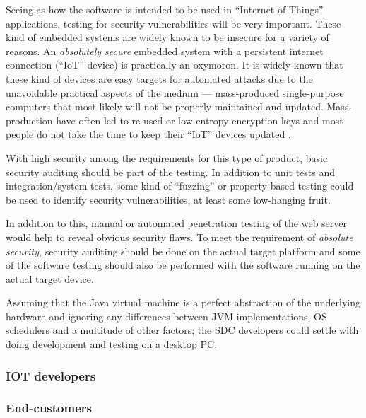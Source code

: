 Seeing as how the software is intended to be used in ``Internet of Things''
applications, testing for security vulnerabilities will be very important.
These kind of embedded systems are widely known to be insecure for a variety of
reasons. \cite{iot-malwarebytes}
An \emph{absolutely secure} embedded system with a persistent internet
connection (``IoT'' device) is practically an oxymoron. It is widely known that
these kind of devices are easy targets for automated attacks due to the
unavoidable practical aspects of the medium --- mass-produced single-purpose
computers that most likely will not be properly maintained and updated.
Mass-production have often led to re-used or low entropy encryption keys
\cite{iot-crypto-key-reuse} and most people do not take the time to keep their
``IoT'' devices updated \cite{iot-attack-waiting-to-happen}.

With high security among the requirements for this type of product, basic
security auditing should be part of the testing.
In addition to unit tests and integration/system tests, some kind of
``fuzzing'' or property-based testing \cite{hypothesis-testing} could be used
to identify security vulnerabilities, at least some low-hanging fruit.

In addition to this, manual or automated penetration testing of the web server
would help to reveal obvious security flaws.
To meet the requirement of \emph{absolute security}, security auditing should
be done on the actual target platform and some of the software testing should
also be performed with the software running on the actual target
device\cite{6006307}.

Assuming that the Java virtual machine is a perfect abstraction of the
underlying hardware and ignoring any differences between JVM implementations,
OS schedulers and a multitude of other factors; the SDC developers could settle
with doing development and testing on a desktop PC.


\subsubsection{IOT developers}


\subsubsection{End-customers}

